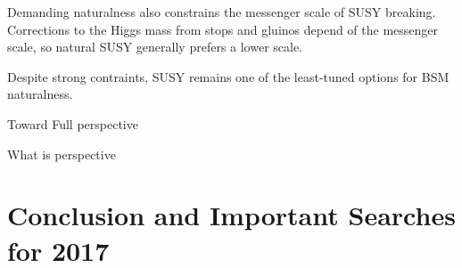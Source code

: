 \documentclass[12pt]{article}
\begin{document}
        Demanding naturalness also constrains the messenger scale of SUSY breaking. Corrections to the Higgs mass from stops and gluinos depend of the messenger scale, so natural SUSY generally prefers a lower scale.

        Despite strong contraints, SUSY remains one of the least-tuned options for BSM naturalness.    

    Toward Full perspective

    What is perspective

\section{Conclusion and Important Searches for 2017}

\clearpage
\pagebreak
\singlespacing
{}

\end{document}
